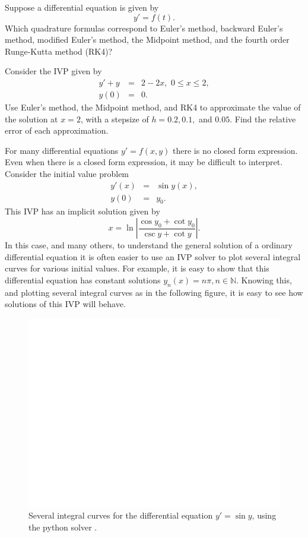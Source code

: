 \begin{problem}
Suppose a differential equation is given by
\[ y' = f(t).\]
Which quadrature formulas correspond to Euler's method, backward Euler's method, modified Euler's method, the Midpoint method, and the fourth order Runge-Kutta method (RK4)? 
\end{problem}


\begin{problem}
Consider the IVP given by 
\begin{eqnarray*}
y' + y &=& 2-2x,\,\, 0 \leq x \leq 2, \\
y(0) &=& 0.
\end{eqnarray*}
Use Euler's method, the Midpoint method, and RK4 to approximate the value of the solution at $x = 2$, with a stepsize of $h = 0.2, 0.1,$ and $0.05 $. Find the relative error of each approximation.
\end{problem}

For many differential equations $y' = f(x,y)$ there is no closed form expression. Even when there is a closed form expression, it may be difficult to interpret. Consider the initial value problem 
\begin{eqnarray*}
y'(x) &=& \sin y(x), \\
y(0) &=& y_0.
\end{eqnarray*}
This IVP has an implicit solution given by 
\[x = \ln \left|\frac{\cos y_0 + \cot y_0}{\csc y + \cot y} \right|.\]
In this case, and many others, to understand the general solution of a ordinary differential equation it is often easier to use an IVP solver to plot several integral curves for various initial values. For example, it is easy to show that this differential equation has constant solutions $y_n(x) = n \pi, n \in \mathbb{N}$. Knowing this, and plotting several integral curves as in the following figure, it is easy to see how solutions of this IVP will behave.


\begin{figure}
\centering
\includegraphics[width=\textwidth]{Fig4.pdf}
\caption{Several integral curves for the differential equation $y' =\sin y$, using the python solver . }
\label{ivp:int_curves}
\end{figure}

